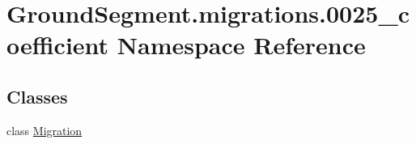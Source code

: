 \hypertarget{namespace_ground_segment_1_1migrations_1_10025__coefficient}{}\section{Ground\+Segment.\+migrations.0025\+\_\+coefficient Namespace Reference}
\label{namespace_ground_segment_1_1migrations_1_10025__coefficient}
\subsection*{Classes}
\begin{DoxyCompactItemize}
\item 
class \hyperlink{class_ground_segment_1_1migrations_1_10025__coefficient_1_1_migration}{Migration}
\end{DoxyCompactItemize}
